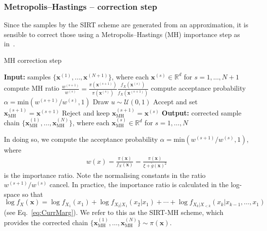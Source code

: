 \subsubsection{Metropolis--Hastings -- correction step}
Since the samples by the SIRT scheme are generated from an approximation, it is sensible to correct those using a Metropolis--Hastings (MH) importance step as in~\cite{dolgov2020approximation}.
\begin{algorithm}[!ht]
	\caption{MH correction step}
	\begin{algorithmic}[1]
		\STATE \textbf{Input:} samples $\{ \bm{x}^{(1)},\dots, \bm{x}^{(N+1)} \} $, where each $\bm{x}^{(s)} \in \mathbb{R}^d$ for $s = 1, \dots, N+1$
		\STATE compute MH ratio $\frac{w^{(s+1)}}{w^{(s)} } =\frac{\pi(\bm{x}^{(s+1)})}{\pi(\bm{x}^{(s)})} \frac{f_X(\bm{x}^{(s)})}{f_X(\bm{x}^{(s+1)})}$ 
		\STATE compute acceptance probability $\alpha = \text{min}(w^{(s+1)}/w^{(s)}, 1)$ 
		\STATE Draw $u \sim \mathcal{U}(0,1)$
		\STATE Accept and set $\bm{x}_{\text{MH}}^{(s+1)} = \bm{x}^{(s+1)}$
		\ELSE  
		\STATE Reject and keep $\bm{x}_{\text{MH}}^{(s+1)} = \bm{x}^{(s)}$
		\ENDIF
		\ENDFOR
		\STATE \textbf{Output:} corrected sample chain $\{ \bm{x}_{\text{MH}}^{(1)},\dots, \bm{x}_{\text{MH}}^{(N)} \} $, where each $\bm{x}_{\text{MH}}^{(s)} \in \mathbb{R}^d$ for $s = 1, \dots, N$
	\end{algorithmic}
	\label{alg:MHCorr}
\end{algorithm}
In doing so, we compute the acceptance probability $  \alpha = \text{min}(w^{(s+1)}/w^{(s)}, 1)$, where 
\begin{align}
	w(x) = \frac{\pi(\bm{x})}{f_X(\bm{x})} = \frac{\pi(\bm{x})}{\xi + \tilde{g}(\bm{x})^2} 
\end{align}
is the importance ratio.
Note the normalising constants in the ratio $w^{(s+1)}/w^{(s)}$ cancel.
In practice, the importance ratio is calculated in the log-space so that $\log f_X(\bm{x})  =  \log f_{X_1}(x_1) + \log f_{X_2|X_1}(x_2|x_1) + \cdots + \log f_{X_k|X_{<k}}(x_k|x_{k-1},\dots,x_1)$ (see Eq.~\ref{eq:CurrMarg}).
We refer to this as the SIRT-MH scheme, which provides the corrected chain $\{\bm{x}_{\text{MH}}^{(1)},\dots,\bm{x}_{\text{MH}}^{(N)}\}\sim\pi(\bm{x})$.


